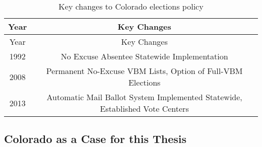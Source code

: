 \documentclass[12pt,twoside]{reedthesis}
\begin{document}
  \begin{longtable}[]{@{}cc@{}}
  \caption{Key changes to Colorado elections policy
  \label{tab:elect_policy}}\tabularnewline
  \toprule
  \begin{minipage}[b]{0.07\columnwidth}\centering\strut
  Year\strut
  \end{minipage} & \begin{minipage}[b]{0.87\columnwidth}\centering\strut
  Key Changes\strut
  \end{minipage}\tabularnewline
  \midrule
  \endfirsthead
  \toprule
  \begin{minipage}[b]{0.07\columnwidth}\centering\strut
  Year\strut
  \end{minipage} & \begin{minipage}[b]{0.87\columnwidth}\centering\strut
  Key Changes\strut
  \end{minipage}\tabularnewline
  \midrule
  \endhead
  \begin{minipage}[t]{0.07\columnwidth}\centering\strut
  1992\strut
  \end{minipage} & \begin{minipage}[t]{0.87\columnwidth}\centering\strut
  No Excuse Absentee Statewide Implementation\strut
  \end{minipage}\tabularnewline
  \begin{minipage}[t]{0.07\columnwidth}\centering\strut
  2008\strut
  \end{minipage} & \begin{minipage}[t]{0.87\columnwidth}\centering\strut
  Permanent No-Excuse VBM Lists, Option of Full-VBM Elections\strut
  \end{minipage}\tabularnewline
  \begin{minipage}[t]{0.07\columnwidth}\centering\strut
  2013\strut
  \end{minipage} & \begin{minipage}[t]{0.87\columnwidth}\centering\strut
  Automatic Mail Ballot System Implemented Statewide, Established Vote
  Centers\strut
  \end{minipage}\tabularnewline
  \bottomrule
  \end{longtable}
  
  \clearpage
  
  \subsection{Colorado as a Case for this
  Thesis}\label{colorado-as-a-case-for-this-thesis}
  
\end{document}
